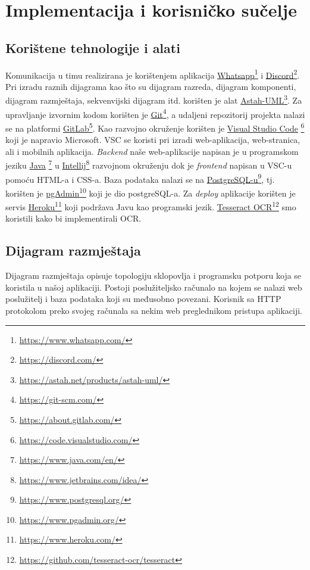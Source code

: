 \chapter{Implementacija i korisničko sučelje}
		
		
		\section{Korištene tehnologije i alati}
		
			 Komunikacija u timu realizirana je korištenjem aplikacija \underline{Whatsapp}\footnote{\url{https://www.whatsapp.com/}} i \underline{Discord}\footnote{\url{https://discord.com/}}. Pri izradu raznih dijagrama kao što su dijagram razreda, dijagram komponenti, dijagram razmještaja, sekvenvijski dijagram itd. korišten je alat \underline{Astah-UML}\footnote{\url{https://astah.net/products/astah-uml/}}.
			 Za upravljanje izvornim kodom korišten je \underline{Git}\footnote{\url{https://git-scm.com/}}, a udaljeni repozitorij projekta nalazi se na platformi \underline{GitLab}\footnote{\url{https://about.gitlab.com/}}.
			 Kao razvojno okruženje korišten je \underline{Visual Studio Code} \footnote{\url{https://code.visualstudio.com/}} koji je napravio Microsoft. VSC se koristi pri izradi web-aplikacija, web-stranica, ali i mobilnih aplikacija.
			 \textit{Backend} naše web-aplikacije napisan je u programskom jeziku \underline{Java} \footnote{\url{https://www.java.com/en/}} u \underline{Intellij}\footnote{\url{https://www.jetbrains.com/idea/}} razvojnom okruženju dok je \textit{frontend} napisan u VSC-u pomoću HTML-a i CSS-a. Baza podataka nalazi se na \underline{PostgreSQL-u}\footnote{\url{https://www.postgresql.org/}}, tj. korišten je \underline{pgAdmin}\footnote{\url{https://www.pgadmin.org/}} koji je dio postgreSQL-a. Za \textit{deploy} aplikacije korišten je servis \underline{Heroku}\footnote{\url{https://www.heroku.com/}} koji podržava Javu kao programski jezik. \underline{Tesseract OCR}\footnote{\url{https://github.com/tesseract-ocr/tesseract}} smo koristili kako bi implementirali OCR.
			
			\eject 
		
	
		
		
		
		\section{Dijagram razmještaja}
		
			 Dijagram razmještaja opisuje topologiju sklopovlja i programsku potporu koja se koristila u našoj aplikaciji. Postoji poslužiteljsko računalo na kojem se nalazi web poslužitelj i baza podataka koji su međusobno povezani. Korisnik sa HTTP protokolom preko svojeg računala sa nekim web preglednikom pristupa aplikaciji.
			 
